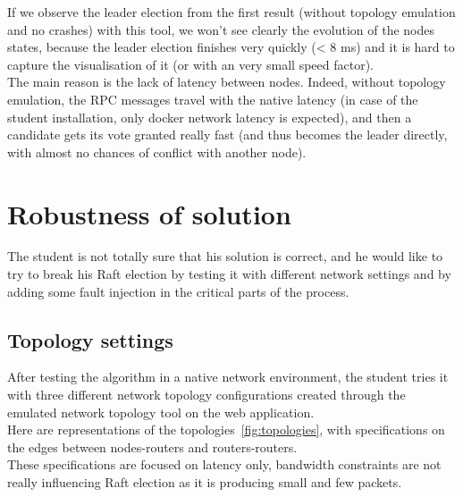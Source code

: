 \documentclass{eplmastersthesis}
\begin{document}
      If we observe the leader election from the first result (without
      topology emulation and no crashes) with this tool, we won't see clearly
      the evolution of the nodes states, because the leader election finishes
      very quickly (< 8 ms) and it is hard to capture the visualisation of it
      (or with an very small speed factor).\\
      The main reason is the lack of latency between nodes. Indeed, without
      topology emulation, the RPC messages travel with the native latency (in case of 
      the student installation, only docker network latency is expected), and then a candidate
      gets its vote granted really fast (and thus becomes the leader directly,
      with almost no chances of conflict with another node).

    \section{Robustness of solution}

      The student is not totally sure that his solution is correct, and he would
      like to try to break his Raft election by testing it with different
      network settings and by adding some fault injection in the critical
      parts of the process.

      \subsection{Topology settings}

        After testing the algorithm in a native network environment,
        the student tries it with three different network
        topology configurations created through the emulated network topology tool on
        the web application.\\
        Here are representations of the topologies~\ref{fig:topologies}, with specifications on
        the edges between nodes-routers and routers-routers.\\
        These specifications are focused on latency only, bandwidth constraints
        are not really influencing Raft election as it is producing small and few
        packets.
\end{document}
